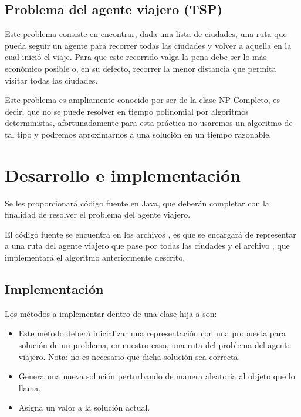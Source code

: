 \subsection{Problema del agente viajero (TSP)}

Este problema consiste en encontrar, dada una lista de ciudades, una ruta que pueda seguir un agente para recorrer todas las ciudades y volver a aquella en la cual inició el viaje.  Para que este recorrido valga la pena debe ser lo más económico posible o, en su defecto, recorrer la menor distancia que permita visitar todas las ciudades.

Este problema es ampliamente conocido por ser de la clase NP-Completo, es decir, que no se puede resolver en tiempo polinomial por algoritmos deterministas, afortunadamente para esta práctica no usaremos un algoritmo de tal tipo y podremos aproximarnos a una solución en un tiempo razonable.



\section{Desarrollo e implementaci\'on}

Se les proporcionará código fuente en Java, que deberán completar con la finalidad de resolver el problema del agente viajero.

El código fuente se encuentra en los archivos , es que se encargará de representar a una ruta del agente viajero que pase por todas las ciudades y el archivo , que implementará el algoritmo anteriormente descrito.

\subsection{Implementaci\'on}

Los métodos a implementar dentro de una clase hija a  son:
\begin{itemize}
 \item {}
 
 Este método deberá inicializar una representación con una propuesta para solución de un problema, en nuestro caso, una ruta del problema del agente viajero.  Nota: no es necesario que dicha solución sea correcta.
 
 \item {}
 
 Genera una nueva solución perturbando de manera aleatoria al objeto que lo llama.
 
 \item {}
 
 Asigna un valor a la solución actual.
\end{itemize}

